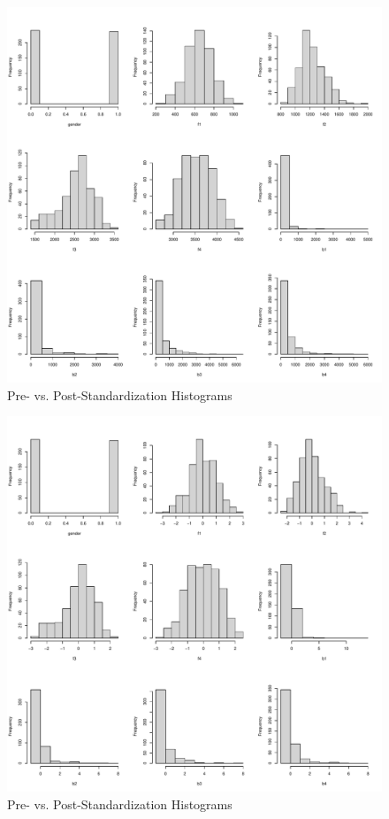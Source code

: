 \documentclass[
]{article}
\begin{document}
\begin{figure}

{\centering \includegraphics[width=1\linewidth,height=1\textheight]{figure/histPlots-5} 

}

\caption{\label{fig:histPlots}Pre- vs. Post-Standardization Histograms}\label{fig:histPlots-5}
\end{figure}
\begin{figure}

{\centering \includegraphics[width=1\linewidth,height=1\textheight]{figure/histPlots-6} 

}

\caption{\label{fig:histPlots}Pre- vs. Post-Standardization Histograms}\label{fig:histPlots-6}
\end{figure}
\end{document}
